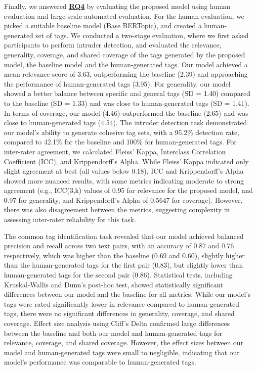 Finally, we answered \hyperref[rq4]{\textbf{RQ4}} by evaluating the proposed model using human evaluation and large-scale automated evaluation. For the human evaluation, we picked a suitable baseline model (Base BERTopic), and created a human-generated set of tags. We conducted a two-stage evaluation, where we first asked participants to perform intruder detection, and evaluated the relevance, generality, coverage, and shared coverage of the tags generated by the proposed model, the baseline model and the human-generated tags. Our model achieved a mean relevance score of 3.63, outperforming the baseline (2.39) and approaching the performance of human-generated tags (3.95). For generality, our model showed a better balance between specific and general tags (SD = 1.40) compared to the baseline (SD = 1.33) and was close to human-generated tags (SD = 1.41). In terms of coverage, our model (4.46) outperformed the baseline (2.65) and was close to human-generated tags (4.54). The intruder detection task demonstrated our model's ability to generate cohesive tag sets, with a 95.2\% detection rate, compared to 42.1\% for the baseline and 100\% for human-generated tags. For inter-rater agreement, we calculated Fleiss' Kappa, Interclass Correlation Coefficient (ICC), and Krippendorff's Alpha. While Fleiss' Kappa indicated only slight agreement at best (all values below 0.18), ICC and Krippendorff's Alpha showed more nuanced results, with some metrics indicating moderate to strong agreement (e.g., ICC(3,k) values of 0.95 for relevance for the proposed model, and 0.97 for generality, and Krippendorff's Alpha of 0.5647 for coverage). However, there was also disagreement between the metrics, suggesting complexity in assessing inter-rater reliability for this task. 

The common tag identification task revealed that our model achieved balanced precision and recall across two text pairs, with an accuracy of 0.87 and 0.76 respectively, which was higher than the baseline (0.69 and 0.60), slightly higher than the human-generated tags for the first pair (0.83), but slightly lower than human-generated tags for the second pair (0.86). Statistical tests, including Kruskal-Wallis and Dunn's post-hoc test, showed statistically significant differences between our model and the baseline for all metrics. While our model's tags were rated significantly lower in relevance compared to human-generated tags, there were no significant differences in generality, coverage, and shared coverage. Effect size analysis using Cliff's Delta confirmed large differences between the baseline and both our model and human-generated tags for relevance, coverage, and shared coverage. However, the effect sizes between our model and human-generated tags were small to negligible, indicating that our model's performance was comparable to human-generated tags.

